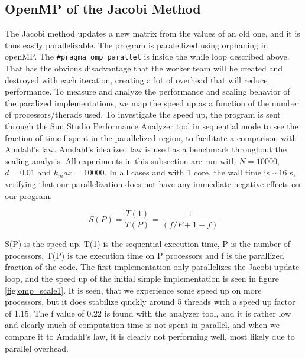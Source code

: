 \subsection{OpenMP of the Jacobi Method}
The Jacobi method updates a new matrix from the values of an old one, and it is thus easily parallelizable. The program is paralellized using orphaning in openMP. The \texttt{\#pragma omp parallel} is inside the while loop described above. That has the obvious disadvantage that the worker team will be created and destroyed with each iteration, creating a lot of overhead that will reduce performance. To measure and analyze the performance and scaling behavior of the paralized implementations, we map the speed up as a function of the number of processors/therads used. To investigate the speed up, the program is sent through the Sun Studio Performance Analyzer tool in sequential mode to see the fraction of time f spent in the parallelized region, to facilitate a comparison with Amdahl's law. Amdahl's idealized law is used as a benchmark throughout the scaling analysis. All experiments in this subsection are run with $N = 10000$, $d = 0.01$ and $k_max = 10000$. In all cases and with 1 core, the wall time is $\sim 16$ s, verifying that our parallelization does not have any immediate negative effects on our program.

\begin{equation}
S(P)=\dfrac{T(1)}{T(P)}=\dfrac{1}{(f/P+1-f)}
\end{equation}

S(P) is the speed up. T(1) is the sequential execution time, P is the number of processors, T(P) is the execution time on P processors and f is the parallized fraction of the code. The first implementation only parallelizes the Jacobi update loop, and the speed up of the initial simple implementation is seen in figure \ref{fig:omp_scale1}. It is seen, that we experience some speed up on more processors, but it does stabilize quickly around 5 threads with a speed up factor of 1.15. The f value of 0.22 is found with the analyzer tool, and it is rather low and clearly much of computation time is not spent in parallel, and when we compare it to Amdahl's law, it is clearly not performing well, most likely due to parallel overhead.


